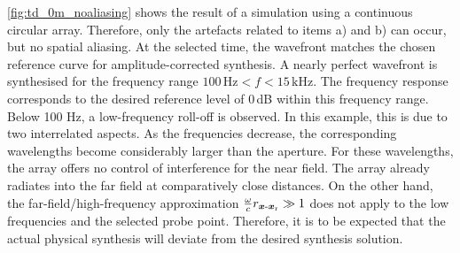 \myfig\ref{fig:td_0m_noaliasing} shows the result of a simulation using a
continuous circular array.
%
Therefore, only the artefacts related to items a) and b) can occur,
but no spatial aliasing.
%
At the selected time, the wavefront matches the chosen
reference curve for amplitude-corrected synthesis.
%
A nearly perfect wavefront is synthesised for the frequency
range $100\,\text{Hz} < f < 15\,\text{kHz}$.
%
%
The frequency response corresponds to the desired reference level of $0$\,dB
within this frequency range.
%
Below 100 Hz, a low-frequency roll-off is observed.
%
In this example, this is due to two interrelated aspects.
%
As the frequencies decrease, the corresponding wavelengths become considerably
larger than the aperture.
%
For these wavelengths, the array offers no control of interference
for the near field.
The array already radiates into the far field at comparatively close distances.
%
On the other hand, the far-field/high-frequency approximation
$\frac{\omega}{c} r_{\bm{x}\text{-}\bm{x}_\mathrm{r}} \gg 1$ does not apply to the low frequencies
and the selected probe point.
%
Therefore, it is to be expected that the actual physical synthesis will
deviate from the desired synthesis solution.



